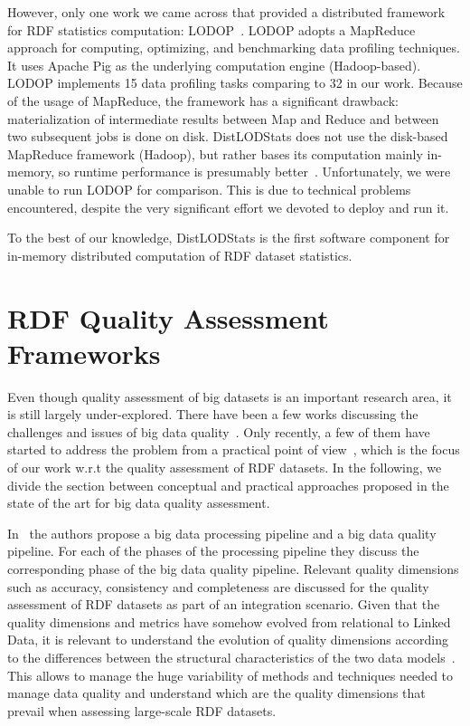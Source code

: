 However, only one work we came across that provided a distributed framework for \gls{RDF} statistics computation: LODOP~\cite{Forchhammer:PROFILES:14}. 
LODOP adopts a MapReduce approach for computing, optimizing, and benchmarking data profiling techniques.
It uses Apache Pig as the underlying computation engine (Hadoop-based). 
LODOP implements 15 data profiling tasks comparing to 32 in our work. 
Because of the usage of MapReduce, the framework has a significant drawback: materialization of intermediate results between Map and Reduce and between two subsequent jobs is done on disk.
DistLODStats does not use the disk-based MapReduce framework (Hadoop), but rather bases its computation mainly in-memory, so runtime performance is presumably better~\cite{Shi:2015:CTM:2831360.2831365}.
Unfortunately, we were unable to run LODOP for comparison. This is due to technical problems encountered, despite the very significant effort we devoted to deploy and run it.

To the best of our knowledge, DistLODStats is the first software component for in-memory distributed computation of \gls{RDF} dataset statistics. 

\section{RDF Quality Assessment Frameworks}
Even though quality assessment of big datasets is an important research area, it is still largely under-explored. 
There have been a few works discussing the challenges and issues of big data quality~\cite{becker2015big,RaoG015,cai2015challenges}. 
Only recently, a few of them have started to address the problem from a practical point of view~\cite{debattista2016luzzu}, which is the focus of our work w.r.t the quality assessment of \gls{RDF} datasets.
In the following, we divide the section between conceptual and practical approaches proposed in the state of the art for big data quality assessment.

In~\cite{CatarciSCD17} the authors propose a big data processing pipeline and a big data quality pipeline. 
For each of the phases of the processing pipeline they discuss the corresponding phase of the big data quality pipeline.
Relevant quality dimensions such as accuracy, consistency and completeness are discussed for the quality assessment of \gls{RDF} datasets as part of an integration scenario.
Given that the quality dimensions and metrics have somehow evolved from relational to Linked Data,
it is relevant to understand the evolution of quality dimensions according to the differences between the structural characteristics of the two data models~\cite{BatiniRSV15}. 
This allows to manage the huge variability of methods and techniques needed to manage data quality and understand which are the quality dimensions that prevail when assessing large-scale \gls{RDF} datasets.

